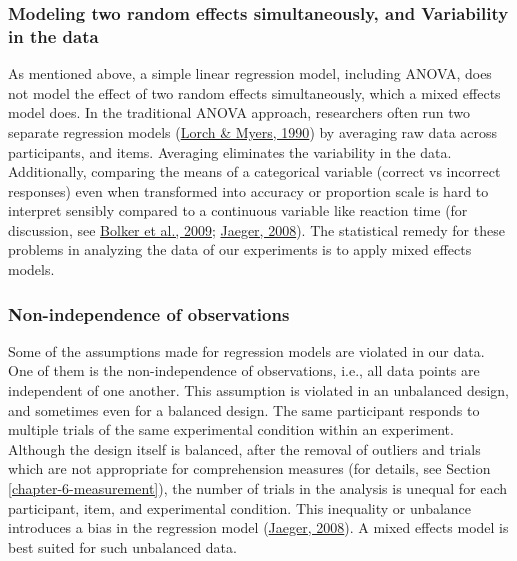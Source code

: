 \documentclass[a4paper, nobind]{templates/ociamthesis}
\begin{document}
\hypertarget{modeling-two-random-effects-simultaneously-and-variability-in-the-data}{%
\subsubsection{Modeling two random effects simultaneously, and Variability in the data}\label{modeling-two-random-effects-simultaneously-and-variability-in-the-data}}

As mentioned above, a simple linear regression model, including ANOVA, does not model the effect of two random effects simultaneously, which a mixed effects model does.
In the traditional ANOVA approach, researchers often run two separate regression models (\protect\hyperlink{ref-Lorch1990}{Lorch \& Myers, 1990}) by averaging raw data across participants, and items.
Averaging eliminates the variability in the data.
Additionally, comparing the means of a categorical variable (correct vs incorrect responses) even when transformed into accuracy or proportion scale is hard to interpret sensibly compared to a continuous variable like reaction time (for discussion, see \protect\hyperlink{ref-Bolker2009}{Bolker et al., 2009}; \protect\hyperlink{ref-Jaeger2008}{Jaeger, 2008}).
The statistical remedy for these problems in analyzing the data of our experiments is to apply mixed effects models.

\hypertarget{non-independence-of-observations}{%
\subsubsection{Non-independence of observations}\label{non-independence-of-observations}}

Some of the assumptions made for regression models are violated in our data.
One of them is the non-independence of observations, i.e., all data points are independent of one another.
This assumption is violated in an unbalanced design, and sometimes even for a balanced design.
The same participant responds to multiple trials of the same experimental condition within an experiment.
Although the design itself is balanced, after the removal of outliers and trials which are not appropriate for comprehension measures (for details, see Section \ref{chapter-6-measurement}),
the number of trials in the analysis is unequal for each participant, item, and experimental condition.
This inequality or unbalance introduces a bias in the regression model (\protect\hyperlink{ref-Jaeger2008}{Jaeger, 2008}).
A mixed effects model is best suited for such unbalanced data.
\end{document}
